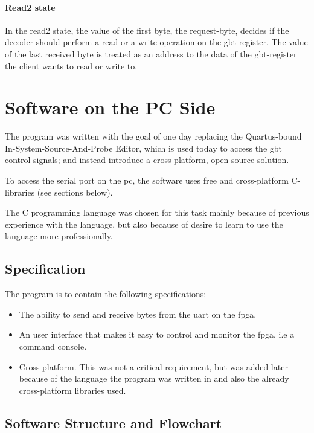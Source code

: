 \documentclass[main.tex]{subfiles}
\begin{document}
\subsubsection{Read2 state}
  In the read2 state, the value of the first byte, the request-byte, decides if the decoder should perform a read or a write operation on the gbt-register. The value of the last received byte is treated as an address to the data of the gbt-register the client wants to read or write to.  


\chapter{Software on the PC Side} \label{chap:software}

The program was written with the goal of one day replacing the Quartus-bound In-System-Source-And-Probe Editor, which is used today to access the \gls{gbt} control-signals; and instead introduce a cross-platform, open-source solution.

To access the serial port on the \acrshort{pc}, the software uses free and cross-platform C-libraries (see sections below).

The C programming language was chosen for this task mainly because of previous experience with the language, but also because of desire to learn to use the language more professionally. 

\section{Specification}

The program is to contain the following specifications:\\
\begin{itemize} \setlength{\itemsep}{10pt}
\item The ability to send and receive bytes from the \gls{uart} on the \gls{fpga}. 
\item An user interface that makes it easy to control and monitor the \gls{fpga}, i.e a command console.
\item Cross-platform. This was not a critical requirement, but was added later because of the language the program was written in and also the already cross-platform libraries used. 
\end{itemize}

\section{Software Structure and Flowchart}
\end{document}
